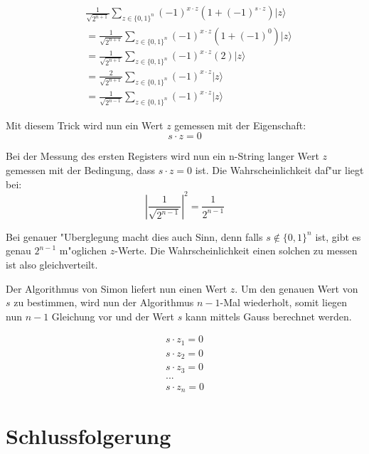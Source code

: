 \begin{refsection}
\begin{align*}
    &\frac1{\sqrt{2^{n + 1}}}
      \sum_{z \in \{0,1\}^n}  { (-1)^{x \cdot z} ( 1 + (-1)^{ s \cdot z}) |z\rangle } 
    \\
    &= 
    \frac1{\sqrt{2^{n + 1}}}
      \sum_{z \in \{0,1\}^n}  { (-1)^{x \cdot z} ( 1 + (-1)^0) |z\rangle } 
    \\
    &= 
    \frac1{\sqrt{2^{n + 1}}}
      \sum_{z \in \{0,1\}^n}  { (-1)^{x \cdot z} (2) |z\rangle } 
    \\
    &= 
    \frac{2}{\sqrt{2^{n + 1}}} 
      \sum_{z \in \{0,1\}^n}  { (-1)^{x \cdot z}|z\rangle } 
    \\
    &= 
    \frac1{\sqrt{2^{n - 1}}} 
      \sum_{z \in \{0,1\}^n}  { (-1)^{x \cdot z}|z\rangle } 
\end{align*}

Mit diesem Trick wird nun ein Wert $z$ gemessen mit der Eigenschaft:
\[
    s \cdot z = 0
\]

Bei der Messung des ersten Registers wird nun ein n-String langer Wert $z$
gemessen mit der Bedingung, dass $s \cdot z = 0$ ist. Die Wahrscheinlichkeit
daf"ur liegt bei:
\[
    |\frac1{\sqrt{2^{n - 1}}}|^2 = \frac1{2^{n-1}} 
\]

Bei genauer "Uberglegung macht dies auch Sinn, denn falls $s \notin \{0,1\}^n$
ist, gibt es genau $2^{n-1}$ m"oglichen $z$-Werte. Die Wahrscheinlichkeit einen
solchen zu messen ist also gleichverteilt.

Der Algorithmus von Simon liefert nun einen Wert $z$. Um den genauen Wert von
$s$ zu bestimmen, wird nun der Algorithmus $n-1$-Mal wiederholt, somit liegen
nun $n-1$ Gleichung vor und der Wert $s$ kann mittels Gauss berechnet werden.

\begin{align*}
    s \cdot z_{1} = 0
    \\
    s \cdot z_{2} = 0
    \\
    s \cdot z_{3} = 0
    \\
    ...
    \\
    s \cdot z_{n} = 0
\end{align*}

\section{Schlussfolgerung}

\begin{figure}[H]
\centering
{}
\end{figure}


\end{refsection}
